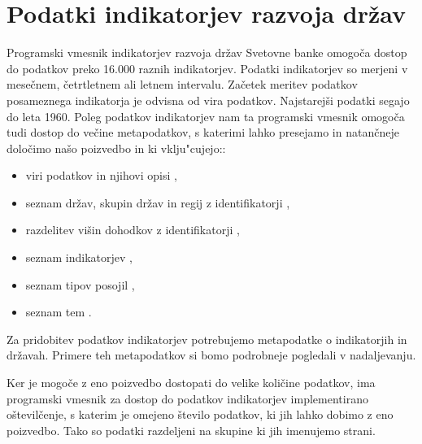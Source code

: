 \section{Podatki indikatorjev razvoja držav}
\label{sec:podatki_ind_razvoja}



Programski vmesnik indikatorjev razvoja držav Svetovne banke omogoča dostop
do podatkov preko 16.000 raznih indikatorjev. Podatki indikatorjev so merjeni v
mesečnem, četrtletnem ali letnem intervalu. Začetek meritev podatkov
posameznega indikatorja je odvisna od vira podatkov. Najstarejši podatki segajo
do leta 1960. Poleg podatkov indikatorjev nam ta programski vmesnik omogoča 
tudi dostop do večine metapodatkov, s katerimi lahko presejamo in natančneje
določimo našo poizvedbo in ki vklju"cujejo::
\begin{itemize}
\item viri podatkov in njihovi opisi 
  ,
\item seznam držav, skupin držav in regij z identifikatorji 
  ,
\item razdelitev višin dohodkov z identifikatorji 
  ,
\item seznam indikatorjev 
  ,
\item seznam tipov posojil 
  ,
\item seznam tem 
  .
\end{itemize}

Za pridobitev podatkov indikatorjev potrebujemo metapodatke o indikatorjih in
državah. Primere teh metapodatkov si bomo podrobneje pogledali v nadaljevanju.

Ker je mogoče z eno poizvedbo dostopati do velike količine podatkov, ima
programski vmesnik za dostop do podatkov indikatorjev implementirano
oštevilčenje,
s katerim je omejeno število podatkov, ki jih lahko dobimo z eno
poizvedbo. Tako so podatki razdeljeni na skupine ki jih imenujemo strani.

